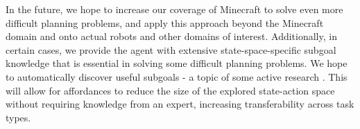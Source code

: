 \documentclass[letterpaper]{article}
\begin{document}
In the future, we hope to increase our coverage of Minecraft to solve even more difficult planning problems, and apply this
approach beyond the Minecraft domain and onto actual robots and other domains of interest. Additionally, in certain cases, we provide
the agent with extensive state-space-specific subgoal knowledge that is essential in solving some difficult planning problems.
We hope to automatically discover useful subgoals - a topic of some active research \cite{Mcgovern01automaticdiscovery,Simsek:2005:IUS:1102351.1102454}.
This will allow for affordances to reduce the size of the explored state-action space without requiring knowledge from an expert, increasing transferability across task types.



\end{document}
